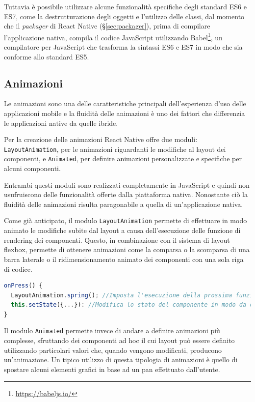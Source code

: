 Tuttavia è possibile utilizzare alcune funzionalità specifiche degli standard ES6 e ES7, come la destrutturazione degli oggetti e l'utilizzo delle classi, dal momento che il \textit{packager} di React Native (§\ref{sec:packager}), prima di compilare l'applicazione nativa, compila il codice JavaScript utilizzando Babel\footnote{\url{https://babeljs.io/}}, un compilatore per JavaScript che trasforma la sintassi ES6 e ES7 in modo che sia conforme allo standard ES5.

\subsection{Animazioni}
Le animazioni sono una delle caratteristiche principali dell'esperienza d'uso delle applicazioni mobile e la fluidità delle animazioni è uno dei fattori che differenzia le applicazioni native da quelle ibride.

Per la creazione delle animazioni React Native offre due moduli: \texttt{LayoutAnimation}, per le animazioni riguardanti le modifiche al layout dei componenti, e \texttt{Animated}, per definire animazioni personalizzate e specifiche per alcuni componenti.

Entrambi questi moduli sono realizzati completamente in JavaScript e quindi non usufruiscono delle funzionalità offerte dalla piattaforma nativa. 
Nonostante ciò la fluidità delle animazioni risulta paragonabile a quella di un'applicazione nativa.

Come già anticipato, il modulo \texttt{LayoutAnimation} permette di effettuare in modo animato le modifiche subite dal layout a causa dell'esecuzione delle funzione di rendering dei componenti.
Questo, in combinazione con il sistema di layout flexbox, permette di ottenere animazioni come la comparsa o la scomparsa di una barra laterale o il ridimensionamento animato dei componenti con una sola riga di codice.

\begin{lstlisting}[language=JavaScript, caption=Utilizzo di LayoutAnimation]
onPress() {
  LayoutAnimation.spring(); //Imposta l'esecuzione della prossima funzione di rendering in modo animato
  this.setState({...}): //Modifica lo stato del componente in modo da causarne il re-rendering
}
\end{lstlisting}

Il modulo \texttt{Animated} permette invece di andare a definire animazioni più complesse, sfruttando dei componenti ad hoc il cui layout può essere definito utilizzando particolari valori che, quando vengono modificati, producono un'animazione.
Un tipico utilizzo di questa tipologia di animazioni è quello di spostare alcuni elementi grafici in base ad un \gls{pan} effettuato dall'utente.

